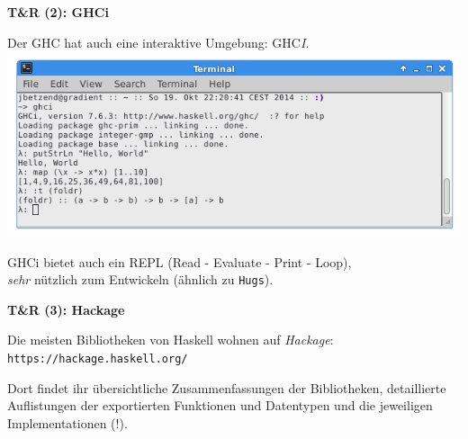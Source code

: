 \documentclass[unknownkeysallowed]{beamer}
\begin{document}
  
  \begin{frame}
    \Large\textbf{T\&R (2): GHCi}\bigskip \normalsize
    
    Der GHC hat auch eine interaktive Umgebung: GHC\emph{I}.\\\bigskip
    \includegraphics[scale=0.4]{ghci_example.png} 
    
    \bigskip GHCi bietet auch ein REPL (Read - Evaluate - Print - Loop),\\\emph{sehr} nützlich zum Entwickeln (ähnlich zu \texttt{Hugs}).
  \end{frame}
  
  
  \begin{frame}
    \Large\textbf{T\&R (3): Hackage}\bigskip \normalsize
    
    Die meisten Bibliotheken von Haskell wohnen auf \emph{Hackage}: \\ \bigskip \texttt{https://hackage.haskell.org/}
    
    Dort findet ihr übersichtliche Zusammenfassungen der Bibliotheken, detaillierte Auflistungen der exportierten Funktionen und Datentypen und die jeweiligen Implementationen (!).
  \end{frame}
  
  
\end{document}
